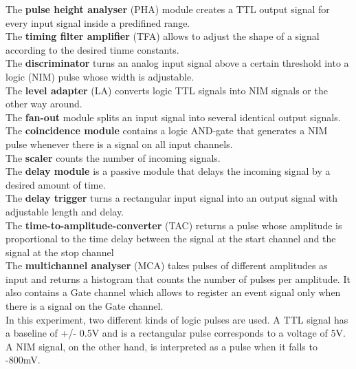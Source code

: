 \documentclass[a4paper,parskip,11pt, DIV12]{scrreprt}
\begin{document}
The \textbf{pulse height analyser} (PHA) module creates a TTL output signal for every input signal inside a predifined range.
\\
The \textbf{timing filter amplifier} (TFA) allows to adjust the shape of a signal according to  the desired tinme constants.
\\
The \textbf{discriminator} turns an analog input signal above a certain threshold into a logic (NIM) pulse whose width is adjustable.
\\
The \textbf{level adapter} (LA) converts logic TTL signals into NIM signals or the other way around.
\\
The \textbf{fan-out} module splits an input signal into several identical output signals.
\\
The \textbf{coincidence module} contains a logic AND-gate that generates a NIM pulse whenever there is a signal on all input channels.
\\
The \textbf{scaler} counts the number of incoming signals. 
\\
The \textbf{delay module} is a passive module that delays the incoming signal by a desired amount of time.
\\
The \textbf{delay trigger} turns a rectangular input signal into an output signal with adjustable length and delay.
\\
The \textbf{time-to-amplitude-converter} (TAC) returns a pulse whose amplitude is proportional to the time delay between the signal at the start channel and the signal at the stop channel
\\
The \textbf{multichannel analyser} (MCA) takes pulses of different amplitudes as input and returns a histogram that counts the number of pulses per amplitude. It also contains a Gate channel which allows to register an event signal only when there is a signal on the Gate channel.
\\
In this experiment, two different kinds of logic pulses are used. A TTL signal has a baseline of +/- 0.5V and is a rectangular pulse corresponds to a voltage of 5V. A NIM signal, on the other hand, is interpreted as a pulse when it falls to -800mV.
\end{document}
